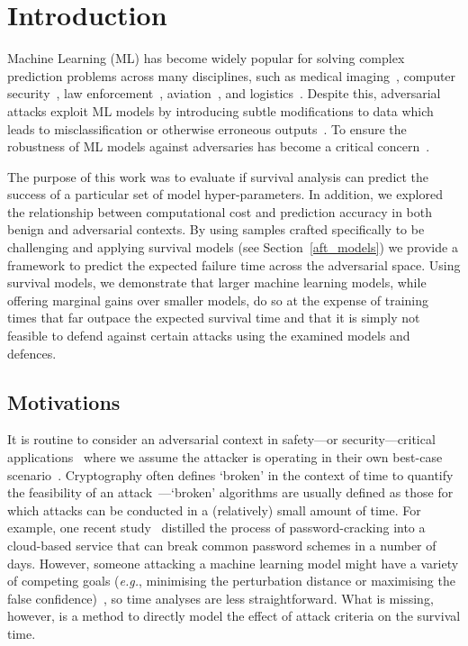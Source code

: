 \section{Introduction}

Machine Learning (ML) has become widely popular for solving complex prediction problems across many disciplines, such as medical imaging~\cite{ai_medical_imaging}, computer security~\cite{ai_security}, law enforcement~\cite{ai_prison}, aviation~\cite{ai_aviation}, and logistics~\cite{ai_luggage}. Despite this, adversarial attacks exploit ML models by introducing subtle modifications to data which leads to misclassification or otherwise erroneous outputs~\cite{chakraborty_adversarial_2018}. To ensure the robustness of ML models against adversaries has become a critical concern~\cite{adversarialpatch,carlini_towards_2017,croce_reliable_2020,hopskipjump,art2018,meyers}.

The purpose of this work was to evaluate if survival analysis can predict the success of a particular set of model hyper-parameters. In addition, we explored the relationship between computational cost and prediction accuracy in both benign and adversarial contexts.  By using samples crafted specifically to be challenging and applying survival models (see Section~\ref{aft_models}) we provide a framework to predict the expected failure time across the adversarial space. Using survival models, we demonstrate that larger machine learning models, while offering marginal gains over smaller models, do so at the expense of training times that far outpace the expected survival time and that it is simply not feasible to defend against certain attacks using the examined models and defences.



\subsection{Motivations}

It is routine to consider an adversarial context in safety---or security---critical applications~\cite{ai_medical_imaging,ai_security,ai_prison,ai_aviation,ai_luggage} where we assume the attacker is operating in their own best-case scenario~\cite{leurent2020sha,kamal2017study,madry2017towards,pixelattack,deepfool,croce_reliable_2020}. Cryptography often defines `broken' in the context of time to quantify the feasibility of an attack~\cite{leurent2020sha}---`broken' algorithms are usually defined as those for which attacks can be conducted in a (relatively) small amount of time. For example, one recent study~\cite{kamal2017study} distilled the process of password-cracking into a cloud-based service that can break common password schemes in a number of days. However, someone attacking a machine learning model might have a variety of competing goals (\textit{e.g.}, minimising the perturbation distance or maximising the false confidence)~\cite{madry2017towards,hopskipjump,pixelattack,fgm,deepfool}, so time analyses are less straightforward. What is missing, however, is a method to directly model the effect of attack criteria on the survival time.

